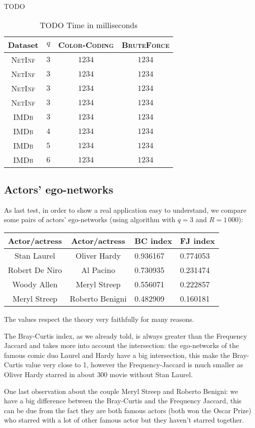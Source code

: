 	TODO
	\begin{table}[h]
		\centering
		\label{my-label}
		\begin{tabular}{|c|c|c|c|}
			\hline
			Dataset 		& $q$ & \textsc{Color-Coding} 	& \textsc{BruteForce} \\ \hline
			\textsc{NetInf}	& $3$ & $1234$					& $1234$ \\ \hline
			\textsc{NetInf}	& $3$ & $1234$					& $1234$ \\ \hline
			\textsc{NetInf}	& $3$ & $1234$					& $1234$ \\ \hline
			\textsc{NetInf}	& $3$ & $1234$					& $1234$ \\ \hline
			\textsc{IMDb}	& $3$ & $1234$					& $1234$ \\ \hline
			\textsc{IMDb}	& $4$ & $1234$					& $1234$ \\ \hline
			\textsc{IMDb}	& $5$ & $1234$					& $1234$ \\ \hline
			\textsc{IMDb}	& $6$ & $1234$					& $1234$ \\ \hline
		\end{tabular}
		\caption{TODO Time in milliseconds}
	\end{table}

	\subsection*{Actors' ego-networks}
	
	As last test, in order to show a real application easy to understand, we compare
	some pairs of actors' ego-networks (using \fcount algorithm with $q=3$ and $R=1\,000$):
	
	\begin{table}[h]
		\centering
		\begin{tabular}{c|c|l|l}
			Actor/actress & Actor/actress & BC index & FJ index\\ 
			\hline
			Stan Laurel & Oliver Hardy & 0.936167 & 0.774053 \\
			Robert De Niro & Al Pacino & 0.730935 & 0.231474\\
			Woody Allen & Meryl Streep & 0.556071 & 0.222857\\
			Meryl Streep & Roberto Benigni & 0.482909 & 0.160181\\
		\end{tabular}
	\end{table}

	The values respect the theory very faithfully for many reasons.
	
	The Bray-Curtis index, as we already told, is always greater than the Frequency Jaccard and takes more into account the intersection:
	the ego-networks of the famous comic duo Laurel and Hardy have a big intersection, this make the Bray-Curtis value very close to 1, however the Frequency-Jaccard is much smaller as Oliver Hardy starred in about $300$ movie without Stan Laurel.
	
	One last observation about the couple Meryl Streep and Roberto Benigni: we have a big difference between the Bray-Curtis and the Frequency Jaccard, this can be due from the fact they are both famous actors (both won the Oscar Prize) who starred with a lot of other famous actor but they haven't starred together.
	
